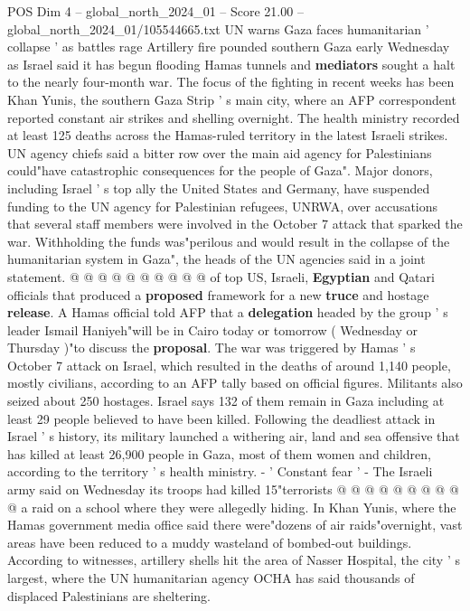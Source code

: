 \begin{textsample}{POS Dim 4 – global\_north\_2024\_01 – Score 21.00 – global\_north\_2024\_01/105544665.txt}  \label{ex:f4_pos_332}
UN warns Gaza faces humanitarian ' collapse ' as battles rage Artillery fire pounded southern Gaza early Wednesday as Israel said it has begun flooding Hamas tunnels and \textbf{mediators} sought a halt to the nearly four-month war.
The focus of the fighting in recent weeks has been Khan Yunis, the southern Gaza Strip ' s main city, where an AFP correspondent reported constant air strikes and shelling overnight.
The health ministry recorded at least 125 deaths across the Hamas-ruled territory in the latest Israeli strikes.
UN agency chiefs said a bitter row over the main aid agency for Palestinians could"have catastrophic consequences for the people of Gaza".
Major donors, including Israel ' s top ally the United States and Germany, have suspended funding to the UN agency for Palestinian refugees, UNRWA, over accusations that several staff members were involved in the October 7 attack that sparked the war.
Withholding the funds was"perilous and would result in the collapse of the humanitarian system in Gaza", the heads of the UN agencies said in a joint statement. @ @ @ @ @ @ @ @ @ @ of top US, Israeli, \textbf{Egyptian} and Qatari officials that produced a \textbf{proposed} framework for a new \textbf{truce} and hostage \textbf{release}.
A Hamas official told AFP that a \textbf{delegation} headed by the group ' s leader Ismail Haniyeh"will be in Cairo today or tomorrow ( Wednesday or Thursday )"to discuss the \textbf{proposal}.
The war was triggered by Hamas ' s October 7 attack on Israel, which resulted in the deaths of around 1,140 people, mostly civilians, according to an AFP tally based on official figures.
Militants also seized about 250 hostages.
Israel says 132 of them remain in Gaza including at least 29 people believed to have been killed.
Following the deadliest attack in Israel ' s history, its military launched a withering air, land and sea offensive that has killed at least 26,900 people in Gaza, most of them women and children, according to the territory ' s health ministry. - ' Constant fear ' - The Israeli army said on Wednesday its troops had killed 15"terrorists @ @ @ @ @ @ @ @ @ @ a raid on a school where they were allegedly hiding.
In Khan Yunis, where the Hamas government media office said there were"dozens of air raids"overnight, vast areas have been reduced to a muddy wasteland of bombed-out buildings.
According to witnesses, artillery shells hit the area of Nasser Hospital, the city ' s largest, where the UN humanitarian agency OCHA has said thousands of displaced Palestinians are sheltering.

\end{textsample}
